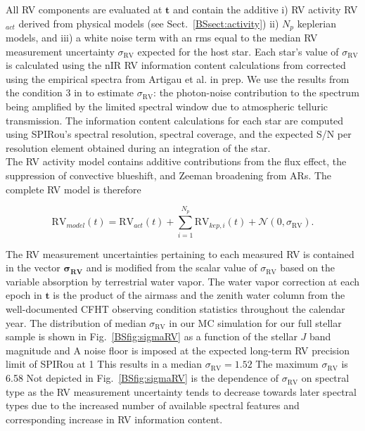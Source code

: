 All RV components are evaluated at $\mathbf{t}$ and contain the additive i) RV activity RV$_{act}$ derived from 
physical models (see Sect.~\ref{BSsect:activity}) ii) $N_p$ keplerian models, and iii) a white noise term with an rms equal
to the median RV measurement uncertainty $\sigma_{\text{RV}}$ expected for the host star. Each star's value of
$\sigma_{\text{RV}}$ is calculated using the nIR RV
information content calculations from \cite{figueira16} corrected using the empirical spectra from Artigau et al. in prep.
We use the results from the condition 3 in \cite{figueira16} to estimate $\sigma_{\text{RV}}$:
the photon-noise contribution to the spectrum
being amplified by the limited spectral window due to atmospheric telluric transmission.
The information content calculations for each star are computed using SPIRou's spectral resolution,
spectral coverage, and the expected S/N per resolution element obtained during an integration of the star. \\

The RV activity model contains additive contributions from the flux effect, the suppression of convective blueshift,
and Zeeman broadening from ARs. The complete RV model is therefore

\begin{equation}
  \text{RV}_{model}(t) = \text{RV}_{act}(t) + \sum_{i=1}^{N_p} \text{RV}_{kep,i}(t) + \mathcal{N}(0,\sigma_{\text{RV}}).
\end{equation}

\noindent The RV measurement uncertainties pertaining to each measured RV is contained in the vector
$\boldsymbol{\sigma_{\text{RV}}}$ and is modified from the scalar value of $\sigma_{\text{RV}}$
based on the variable absorption by terrestrial
water vapor. The water vapor correction at each epoch in $\mathbf{t}$ is the product of the airmass and the zenith
water column from the well-documented CFHT observing condition statistics throughout the calendar year. 
The distribution of median $\sigma_{\text{RV}}$ in our MC simulation for our full
stellar sample is shown in Fig.~\ref{BSfig:sigmaRV} as a function
of the stellar $J$ band magnitude and  A noise floor is imposed at the expected long-term RV precision limit
of SPIRou at 1  This results in a median
$\sigma_{\text{RV}}=1.52$  The maximum $\sigma_{\text{RV}}$ is 6.58  
Not depicted in Fig.~\ref{BSfig:sigmaRV} is the dependence of
$\sigma_{\text{RV}}$ on spectral type as the RV measurement uncertainty tends to decrease towards later spectral types
due to the increased number of available spectral features and corresponding increase in RV information content. \\

